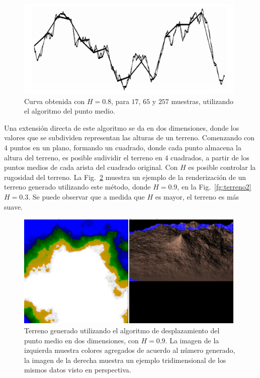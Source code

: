 \begin{figure}
\center
\includegraphics[width=11cm]{figures/puntomedio}
\caption[Curva obtenida utilizando el algoritmo del punto medio]{Curva obtenida con $H=0.8$, para $17$, $65$ y $257$ muestras, utilizando el algoritmo del punto medio.}
\label{fg:puntomedio}
\end{figure}


Una extensión directa de este algoritmo se da en dos dimensiones, donde los valores que se subdividen representan las alturas de un terreno.
Comenzando con $4$ puntos en un plano, formando un cuadrado, donde cada punto almacena la altura del terreno, es posible sudividir el terreno en $4$ cuadrados, a partir de los puntos medios de cada arista del cuadrado original.
Con $H$ es posible controlar la rugosidad del terreno.
La Fig.~\ref{fg:terreno} muestra un ejemplo de la renderización de un terreno generado utilizando este método, donde $H = 0.9$, en la Fig.~\ref{fg:terreno2} $H = 0.3$.
Se puede observar que a medida que $H$ es mayor, el terreno es más suave.

\begin{figure}
\center
\includegraphics[width=11cm]{figures/terreno}
\caption[Terreno generado utilizando el algoritmo de desplazamiento del punto medio en dos dimensiones, con $H = 0.9$]{Terreno generado utilizando el algoritmo de desplazamiento del punto medio en dos dimensiones, con $H = 0.9$. La imagen de la izquierda muestra colores agregados de acuerdo al número generado, la imagen de la derecha muestra un ejemplo tridimensional de los mismos datos visto en perspectiva.}
\label{fg:terreno}
\end{figure}

